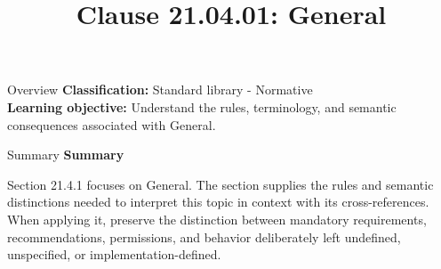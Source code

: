 \documentclass[10pt,letterpaper]{article}
\title{Clause 21.04.01: General}
\author{}
\date{}
\begin{document}
\maketitle
\begin{CornellOverviewBox}{Overview}
\textbf{Classification:} Standard library - Normative\\[2pt]
\textbf{Learning objective:} Understand the rules, terminology, and semantic consequences associated with General.
\end{CornellOverviewBox}\begin{CornellSummaryBox}{Summary}
{\sffamily\bfseries\color{Accent} Summary}\par\vspace{3pt}Section 21.4.1 focuses on General. The section supplies the rules and semantic distinctions needed to interpret this topic in context with its cross-references. When applying it, preserve the distinction between mandatory requirements, recommendations, permissions, and behavior deliberately left undefined, unspecified, or implementation-defined.
\end{CornellSummaryBox}
\end{document}
